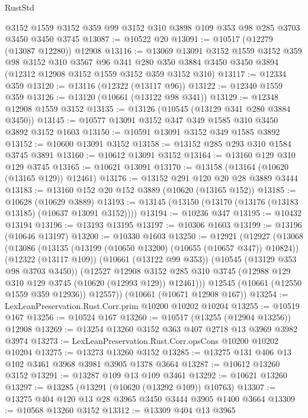 \begin{lexlean}{RustStd}
\begin{coremodule}
    @3152
    @1559
    @3152
    @359
    @99
    @3152
    @310
    @3898
    @109
    @353
    @98
    @285
    @3703
    @3450
    @3450
    @3745
@13087 := @10522 @20
@13091 := @10517 (@12279 (@13087 @12280)) @12908
@13116 := @13069
    @13091
    @3152
    @1559
    @3152
    @359
    @98
    @3152
    @310
    @3567
    @96
    @341
    @280
    @350
    @3884
    @3450
    @3450
    @3894
    (@12312 @12908 @3152 @1559 @3152 @359 @3152 @310)
@13117 := @12334 @359
@13120 := @13116 (@12322 (@13117 @96))
@13122 := @12340 @1559 @359
@13126 := @13120 (@10661 (@13122 @98 @341))
@13129 := @12348 @12908 @1559 @3152
@13135 := @13126 (@10545 (@13129 @341 @280 @3884 @3450))
@13145 := @10577 @13091 @3152 @347 @349 @1585 @310 @3450 @3892 @3152 @1603
@13150 := @10591 @13091 @3152 @349 @1585 @3892
@13152 := @10600 @13091 @3152
@13158 := @13152 @285 @293 @310 @1584 @3745 @3891
@13160 := @10612 @13091 @3152
@13164 := @13160 @129 @310 @129 @3745
@13165 := @10621 @13091
@13170 := @13158 (@13164 (@10620 (@13165 @129)) @12461)
@13176 := @13152 @291 @120 @20 @28 @3889 @3444
@13183 := @13160 @152 @20 @152 @3889 (@10620 (@13165 @152))
@13185 := @10628 (@10629 @3889)
@13193 := @13145 (@13150 (@13170 (@13176 (@13183 @13185) (@10637 @13091 @3152))))
@13194 := @10236 @347
@13195 := @10432 @13194
@13196 := @13193 @13195
@13197 := @10306 @1603
@13199 := @13196 (@10646 @13197)
@13200 := @10330 @1603
@13250 := @12921
    (@12927
      (@13068
        (@13086
          (@13135 (@13199 (@10650 @13200) (@10655 (@10657 @347)) @10824))
          (@12322 (@13117 @109))
          (@10661 (@13122 @99 @353))
          (@10545 (@13129 @353 @98 @3703 @3450))
          (@12527
            @12908
            @3152
            @285
            @310
            @3745
            (@12988 @129 @310 @129 @3745 (@10620 (@12993 @129)) @12461)))
        @12545
        (@10661 (@12550 @1559 @359 @12936))
        @12557))
    (@10661 (@10671 @12908 @167))
@13254 := LexLeanPreservation.Rust.Corr.prim @10200 @10202 @10204
@13255 := @10519 @167
@13256 := @10524 @167
@13260 := @10517 (@13255 (@12904 @13256)) @12908
@13269 := @13254 @13260 @3152 @363 @407 @2718 @13 @3969 @3982 @3974
@13273 := LexLeanPreservation.Rust.Corr.opsCons @10200 @10202 @10204
@13275 := @13273 @13260 @3152
@13285 := @13275 @131 @406 @13 @102 @3461 @3968 @3981 @3905 @1378 @3664
@13287 := @10612 @13260 @3152
@13291 := @13287 @109 @13 @109 @3461
@13292 := @10621 @13260
@13297 := @13285 (@13291 (@10620 (@13292 @109)) @10763)
@13307 := @13275 @404 @120 @13 @28 @3965 @3450 @3444 @3905 @1400 @3664
@13309 := @10568 @13260 @3152
@13312 := @13309 @404 @13 @3965

\end{coremodule}
\end{lexlean}
